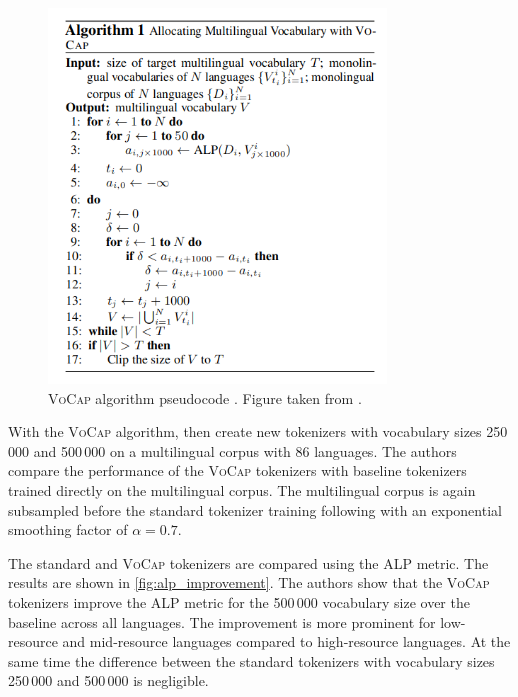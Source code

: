 \begin{figure}[ht]
    \centering
    \includegraphics[width=0.8\textwidth]{img/temp/vocap_algo.png}
    \caption{\textsc{VoCap} algorithm pseudocode \cite{zheng_allocating_2021}. Figure taken from \cite{zheng_allocating_2021}.}
    \label{alg:vocab_allocation}
\end{figure}

With the \textsc{VoCap} algorithm,  then create new tokenizers with vocabulary sizes 250\,000 and 500\,000 on a multilingual corpus with 86 languages. The authors compare the performance of the \textsc{VoCap} tokenizers with baseline tokenizers trained directly on the multilingual corpus. The multilingual corpus is again subsampled before the standard tokenizer training following \citet{devlin_bert_2019,lample_cross-lingual_2019} with an exponential smoothing factor of $\alpha=0.7$.

The standard and \textsc{VoCap} tokenizers are compared using the ALP metric. The results are shown in \autoref{fig:alp_improvement}. The authors show that the \textsc{VoCap} tokenizers improve the ALP metric for the 500\,000 vocabulary size over the baseline across all languages. The improvement is more prominent for low-resource and mid-resource languages compared to high-resource languages. At the same time the difference between the standard tokenizers with vocabulary sizes 250\,000 and 500\,000 is negligible.

